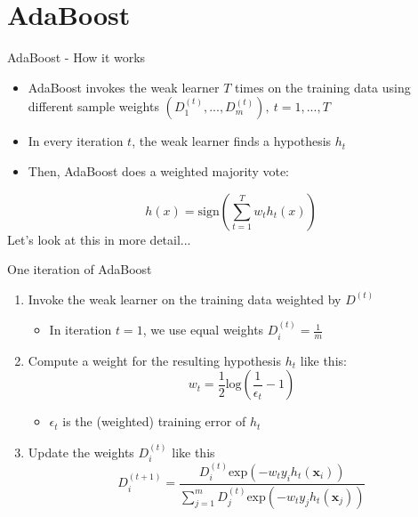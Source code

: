 \section{AdaBoost}

\begin{frame}{AdaBoost - How it works}
    \begin{itemize} \pause
        \item AdaBoost invokes the weak learner $T$ times
            on the training data using different sample weights
            $(D_1^{(t)}, ..., D_m^{(t)}), \  t=1, ..., T$ \pause
        \item In every iteration $t$, the weak learner finds a hypothesis $h_t$ \pause
        \item Then, AdaBoost does a weighted majority vote:
    \end{itemize}
    \begin{equation*}
        h(x) = \text{sign}\left( \sum_{t=1}^T w_t h_t(x) \right)
    \end{equation*} \pause
    Let's look at this in more detail...
\end{frame}

\begin{frame}{One iteration of AdaBoost}
    \begin{enumerate} \pause
        \item Invoke the weak learner on the training data weighted by $D^{(t)}$
        \begin{itemize}
            \item In iteration $t=1$, we use equal weights $D_i^{(t)}=\frac{1}{m}$
        \end{itemize} \pause
        \item Compute a weight for the resulting hypothesis $h_t$ like this:
        \begin{equation*}
            w_t = \frac{1}{2} \text{log} \left( \frac{1}{\epsilon_t} - 1 \right)
        \end{equation*}
        \begin{itemize}
            \item $\epsilon_t$ is the (weighted) training error of $h_t$ \pause
        \end{itemize}
        \item Update the weights $D_i^{(t)}$ like this
        \begin{equation*}
            D_i^{(t+1)} = \frac{D_i^{(t)} \text{exp} \left( -w_t y_i h_t(\mathbf{x}_i) \right)}{
        \sum_{j=1}^m D_j^{(t)} \text{exp} \left( -w_t y_j h_t(\mathbf{x}_j) \right) }
        \end{equation*}
    \end{enumerate}
\end{frame}

